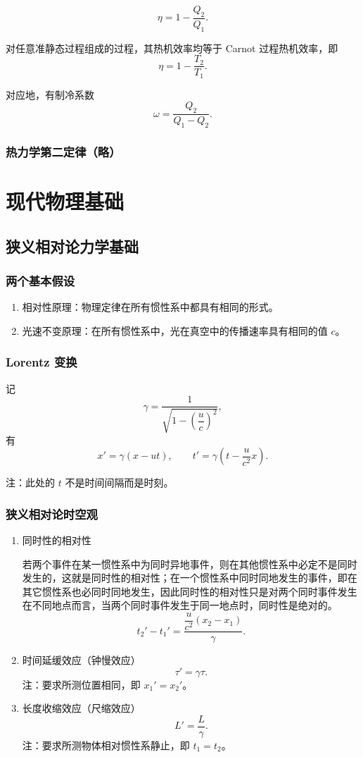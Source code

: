 \documentclass[UTF8,fontset=fandol,zihao=5]{ctexart}
\begin{document}
\[
  \eta=1-\frac{Q_2}{Q_1}.
\]

对任意准静态过程组成的过程，其热机效率均等于 Carnot 过程热机效率，即
\[
  \eta=1-\frac{T_2}{T_1}.
\]

对应地，有制冷系数
\[
  \omega=\frac{Q_2}{Q_1-Q_2}.
\]

\subsubsection{热力学第二定律（略）}

\section{现代物理基础}

\subsection{狭义相对论力学基础}

\subsubsection{两个基本假设}

\begin{enumerate}
  \item 相对性原理：物理定律在所有惯性系中都具有相同的形式。
  \item 光速不变原理：在所有惯性系中，光在真空中的传播速率具有相同的值 \(c\)。
\end{enumerate}

\subsubsection{Lorentz 变换}

记
\[
  \gamma=\frac{1}{\sqrt{1-\left(\dfrac uc\right)^2}},
\]
有
\[
  x'=\gamma(x-ut),
  \qquad
  t'=\gamma\left(t-\frac{u}{c^2}x\right).
\]

注：此处的 \(t\) 不是时间间隔而是时刻。

\subsubsection{狭义相对论时空观}

\begin{enumerate}
  \item 同时性的相对性

  若两个事件在某一惯性系中为同时异地事件，则在其他惯性系中必定不是同时发生的，这就是同时性的相对性；在一个惯性系中同时同地发生的事件，即在其它惯性系也必同时同地发生，因此同时性的相对性只是对两个同时事件发生在不同地点而言，当两个同时事件发生于同一地点时，同时性是绝对的。
  \[
    t_2'-t_1'=\frac{\dfrac{u}{c^2}(x_2-x_1)}{\gamma}.
  \]

  \item 时间延缓效应（钟慢效应）
  \[
    \tau'=\gamma\tau.
  \]
  注：要求所测位置相同，即 \(x_1'=x_2'\)。

  \item 长度收缩效应（尺缩效应）
  \[
    L'=\frac L\gamma.
  \]
  注：要求所测物体相对惯性系静止，即 \(t_1=t_2\)。
\end{enumerate}
\end{document}
